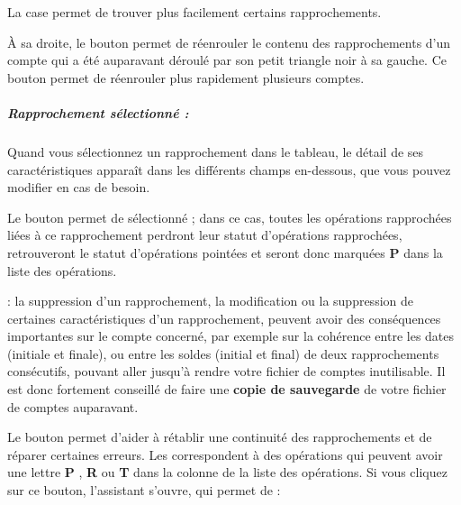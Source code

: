 
La case  permet de trouver plus facilement certains rapprochements. 

À sa droite, le bouton   permet de réenrouler le contenu des rapprochements d'un compte qui a été auparavant déroulé par son petit triangle noir à sa gauche. Ce bouton permet de réenrouler plus rapidement plusieurs comptes.


\subparagraph{Rapprochement sélectionné :}

Quand vous sélectionnez un rapprochement dans le tableau, le détail de ses caractéristiques apparaît dans les différents champs en-dessous, que vous pouvez modifier en cas de besoin.

Le bouton  permet de  sélectionné ; dans ce cas, toutes les opérations rapprochées liées à ce rapprochement perdront leur statut d'opérations rapprochées, retrouveront le statut d'opérations pointées et seront donc marquées \og \textbf{P} \fg{} dans la liste des opérations. 

 : la suppression d'un rapprochement, la modification ou la suppression de certaines caractéristiques d'un rapprochement, peuvent avoir des conséquences importantes sur le compte concerné, par exemple sur la cohérence entre les dates (initiale et finale), ou entre les soldes (initial et final) de deux rapprochements consécutifs, pouvant aller jusqu'à rendre votre fichier de comptes inutilisable. Il est donc fortement conseillé de faire une \textbf{copie de sauvegarde} de votre fichier de comptes auparavant.


Le bouton  permet d'aider à rétablir une continuité des rapprochements et de réparer certaines erreurs. Les  correspondent à des opérations qui peuvent avoir une lettre \og \textbf{P} \fg{}, \og \textbf{R} \fg{} ou \og \textbf{T} \fg{} dans la colonne  de la liste des opérations. Si vous cliquez sur ce bouton, l'assistant s'ouvre, qui permet de  :

